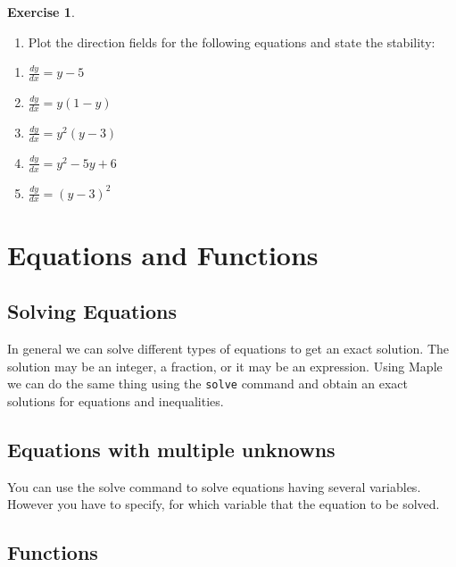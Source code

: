 \documentclass[
]{book}
\providecommand{\tightlist}{%
  \setlength{\itemsep}{0pt}\setlength{\parskip}{0pt}}
\theoremstyle{definition}
\theoremstyle{definition}
\theoremstyle{definition}
\newtheorem{exercise}{Exercise}[chapter]
\theoremstyle{definition}
\theoremstyle{remark}
\begin{document}
\begin{exercise}
\protect\hypertarget{exr:unnamed-chunk-54}{}\label{exr:unnamed-chunk-54}\leavevmode

\begin{enumerate}
\def\labelenumi{\arabic{enumi}.}
\setcounter{enumi}{1}
\tightlist
\item
  Plot the direction fields for the following equations and state the stability:
\end{enumerate}

\begin{enumerate}
\def\labelenumi{(\roman{enumi})}
\tightlist
\item
  \(\frac{dy}{dx} = y - 5\)
\item
  \(\frac{dy}{dx} = y(1 - y)\)
\item
  \(\frac{dy}{dx} = y^2(y - 3)\)
\item
  \(\frac{dy}{dx} = y^2 - 5y + 6\)
\item
  \(\frac{dy}{dx} = (y - 3)^2\)
\end{enumerate}

\end{exercise}

\chapter{Equations and Functions}\label{equations-and-functions}

\section{Solving Equations}\label{solving-equations}

In general we can solve different types of equations to get an exact solution. The solution may be an integer, a fraction, or it may be an expression. Using Maple we can do the same thing using the \texttt{solve} command and obtain an exact solutions for equations and inequalities.

\section{Equations with multiple unknowns}\label{equations-with-multiple-unknowns}

You can use the solve command to solve equations having several variables. However you have to specify, for which variable that the equation to be solved.

\section{Functions}\label{functions}
\end{document}
